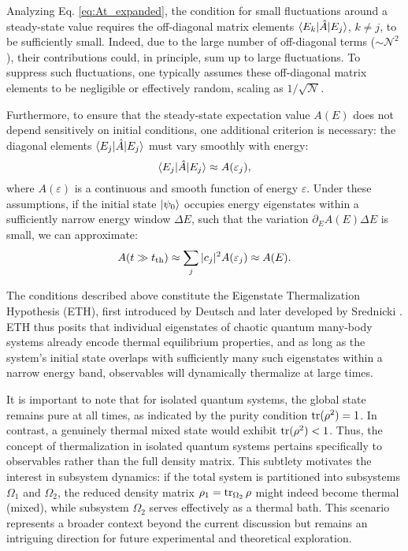 Analyzing Eq. \eqref{eq:At_expanded}, the condition for small fluctuations around a steady-state value requires the off-diagonal matrix elements $\bk{E_k}[\hat{A}]{E_j}$, $k\neq j$, to be sufficiently small. Indeed, due to the large number of off-diagonal terms ($\sim \mathcal{N}^2$), their contributions could, in principle, sum up to large fluctuations. To suppress such fluctuations, one typically assumes these off-diagonal matrix elements to be negligible or effectively random, scaling as $1/\sqrt{\mathcal{N}}$.

Furthermore, to ensure that the steady-state expectation value $A(E)$ does not depend sensitively on initial conditions, one additional criterion is necessary: the diagonal elements $\bk{E_j}[\hat{A}]{E_j}$ must vary smoothly with energy:
\begin{equation}
\bk{E_j}[\hat{A}]{E_j} \approx A(\varepsilon_j),
\end{equation}
where $A(\varepsilon)$ is a continuous and smooth function of energy $\varepsilon$. Under these assumptions, if the initial state $\left| \psi_0 \right\rangle$ occupies energy eigenstates within a sufficiently narrow energy window $\Delta E$, such that the variation $\partial_E A(E)\Delta E$ is small, we can approximate:
\begin{equation}
A(t \gg t_{\textnormal{th}}) \approx \sum_j |c_j|^2 A(\varepsilon_j) \approx A(E).
\end{equation}

The conditions described above constitute the Eigenstate Thermalization Hypothesis (ETH), first introduced by Deutsch \cite{deutsch_quantum_1991} and later developed by Srednicki \cite{srednicki_chaos_1994}. ETH thus posits that individual eigenstates of chaotic quantum many-body systems already encode thermal equilibrium properties, and as long as the system's initial state overlaps with sufficiently many such eigenstates within a narrow energy band, observables will dynamically thermalize at large times.

It is important to note that for isolated quantum systems, the global state remains pure at all times, as indicated by the purity condition $\mathop{\mathrm{tr}}\nolimits(\rho^2) = 1$. In contrast, a genuinely thermal mixed state would exhibit $\mathop{\mathrm{tr}}\nolimits(\rho^2) < 1$. Thus, the concept of thermalization in isolated quantum systems pertains specifically to observables rather than the full density matrix. This subtlety motivates the interest in subsystem dynamics: if the total system is partitioned into subsystems $\Omega_1$ and $\Omega_2$, the reduced density matrix $\rho_1 = \mathop{\mathrm{tr}}\nolimits_{\Omega_2} \rho$ might indeed become thermal (mixed), while subsystem $\Omega_2$ serves effectively as a thermal bath. This scenario represents a broader context beyond the current discussion but remains an intriguing direction for future experimental and theoretical exploration.

